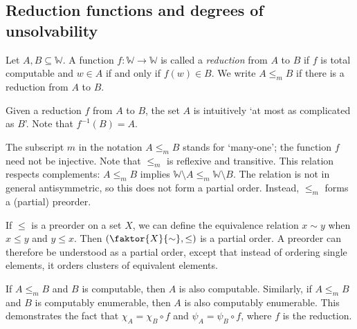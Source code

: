 \subsection{Reduction functions and degrees of unsolvability}
\begin{definition}
	Let \( A, B \subseteq \mathbb W \).
	A function \( f \colon \mathbb W \to \mathbb W \) is called a \emph{reduction} from \( A \) to \( B \) if \( f \) is total computable and \( w \in A \) if and only if \( f(w) \in B \).
	We write \( A \leq_m B \) if there is a reduction from \( A \) to \( B \).
\end{definition}
\begin{remark}
	Given a reduction \( f \) from \( A \) to \( B \), the set \( A \) is intuitively `at most as complicated as \( B \)'.
	Note that \( f^{-1}(B) = A \).
\end{remark}
The subscript \( m \) in the notation \( A \leq_m B \) stands for `many-one'; the function \( f \) need not be injective.
Note that \( \leq_m \) is reflexive and transitive.
This relation respects complements: \( A \leq_m B \) implies \( \mathbb W \setminus A \leq_m \mathbb W \setminus B \).
The relation is not in general antisymmetric, so this does not form a partial order.
Instead, \( \leq_m \) forms a (partial) preorder.

If \( \leq \) is a preorder on a set \( X \), we can define the equivalence relation \( x \sim y \) when \( x \leq y \) and \( y \leq x \).
Then \( \qty(\faktor{X}{\sim}, \leq) \) is a partial order.
A preorder can therefore be understood as a partial order, except that instead of ordering single elements, it orders clusters of equivalent elements.

If \( A \leq_m B \) and \( B \) is computable, then \( A \) is also computable.
Similarly, if \( A \leq_m B \) and \( B \) is computably enumerable, then \( A \) is also computably enumerable.
This demonstrates the fact that \( \chi_A = \chi_B \circ f \) and \( \psi_A = \psi_B \circ f \), where \( f \) is the reduction.

